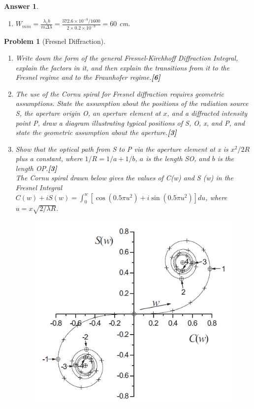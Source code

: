 \documentclass[a4paper]{article}
\newtheorem{ans}{Answer}[subsection]
\theoremstyle{new}
\newtheorem{qns}{Problem}[subsection]
\begin{document}
\begin{ans}
\begin{enumerate}[label=(\roman*)]
$$(m+\frac{1}{N})\lambda_1=m\lambda_2=m(\lambda_1+\Delta\lambda)\implies\Delta\lambda=\frac{\lambda_1}{Nm}=\frac{\lambda_1b}{Wm}$$
\item $W_{min}=\frac{\lambda_1b}{m\Delta\lambda}=\frac{372.6\times10^{-9}/1600}{2\times 0.2\times10^{-9}}=60$ cm.
\end{enumerate}
\end{ans}
\newpage
\begin{qns}[Fresnel Diffraction]\leavevmode
\begin{enumerate}[label=(\roman*)]
\item Write down the form of the general Fresnel-Kirchhoff Diffraction Integral, explain the factors in it, and then explain the transitions from it to the Fresnel regime and to the Fraunhofer regime.\hfill\textbf{[6]}
\item The use of the Cornu spiral for Fresnel diffraction requires geometric assumptions. State the assumption about the positions of the radiation source S, the aperture origin O, an aperture element at $x$, and a diffracted intensity point P, draw a diagram illustrating typical positions of S, O, x, and P, and state the geometric assumption about the aperture.\hfill\textbf{[3]}
\item Show that the optical path from S to P via the aperture element at x is $x^2/2R$ plus a constant, where $1/R=1/a+1/b$, $a$ is the length SO, and $b$ is the length OP.\hfill\textbf{[3]}\\[5pt]
The Cornu spiral drawn below gives the values of C(w) and S (w) in the Fresnel Integral $C(w)+iS(w)=\int_0^w[\cos(0.5\pi u^2)+i\sin(0.5\pi u^2)]du$, where $u=x\sqrt{2/\lambda R}$.
\begin{figure}[H]
    \centering
    \includegraphics[width=\linewidth]{2014P2B9Q.PNG}

\end{figure}
\end{enumerate}
\end{qns}
\end{document}
